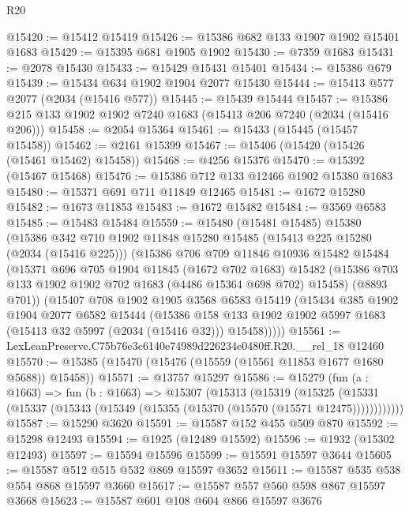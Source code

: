 \begin{lexlean}{R20}
\begin{coremodule}
@15420 := @15412 @15419
@15426 := @15386 @682 @133 @1907 @1902 @15401 @1683
@15429 := @15395 @681 @1905 @1902
@15430 := @7359 @1683
@15431 := @2078 @15430
@15433 := @15429 @15431 @15401
@15434 := @15386 @679
@15439 := @15434 @634 @1902 @1904 @2077 @15430
@15444 := @15413 @577 @2077 (@2034 (@15416 @577))
@15445 := @15439 @15444
@15457 := @15386 @215 @133 @1902 @1902 @7240 @1683 (@15413 @206 @7240 (@2034 (@15416 @206)))
@15458 := @2054 @15364
@15461 := @15433 (@15445 (@15457 @15458))
@15462 := @2161 @15399
@15467 := @15406 (@15420 (@15426 (@15461 @15462) @15458))
@15468 := @4256 @15376
@15470 := @15392 (@15467 @15468)
@15476 := @15386 @712 @133 @12466 @1902 @15380 @1683
@15480 := @15371 @691 @711 @11849 @12465
@15481 := @1672 @15280
@15482 := @1673 @11853
@15483 := @1672 @15482
@15484 := @3569 @6583
@15485 := @15483 @15484
@15559 := @15480
    (@15481 @15485)
    @15380
    (@15386
      @342
      @710
      @1902
      @11848
      @15280
      @15485
      (@15413 @225 @15280 (@2034 (@15416 @225)))
      (@15386
        @706
        @709
        @11846
        @10936
        @15482
        @15484
        (@15371
          @696
          @705
          @1904
          @11845
          (@1672 @702 @1683)
          @15482
          (@15386 @703 @133 @1902 @1902 @702 @1683 (@4486 @15364 @698 @702) @15458)
          (@8893 @701))
        (@15407
          @708
          @1902
          @1905
          @3568
          @6583
          @15419
          (@15434
            @385
            @1902
            @1904
            @2077
            @6582
            @15444
            (@15386
              @158
              @133
              @1902
              @1902
              @5997
              @1683
              (@15413 @32 @5997 (@2034 (@15416 @32)))
              @15458)))))
@15561 := LexLeanPreserve.C75b76e3c6140e74989d226234e0480ff.R20.__rel_18 @12460
@15570 := @15385 (@15470 (@15476 (@15559 (@15561 @11853 @1677 @1680 @5688)) @15458))
@15571 := @13757 @15297
@15586 := @15279
    (fun (a : @1663) =>
    fun (b : @1663) =>
    @15307
      (@15313
        (@15319
          (@15325 (@15331 (@15337 (@15343 (@15349 (@15355 (@15370 (@15570 (@15571 @12475))))))))))))
@15587 := @15290 @3620
@15591 := @15587 @152 @455 @509 @870
@15592 := @15298 @12493
@15594 := @1925 (@12489 @15592)
@15596 := @1932 (@15302 @12493)
@15597 := @15594 @15596
@15599 := @15591 @15597 @3644
@15605 := @15587 @512 @515 @532 @869 @15597 @3652
@15611 := @15587 @535 @538 @554 @868 @15597 @3660
@15617 := @15587 @557 @560 @598 @867 @15597 @3668
@15623 := @15587 @601 @108 @604 @866 @15597 @3676

\end{coremodule}
\end{lexlean}
